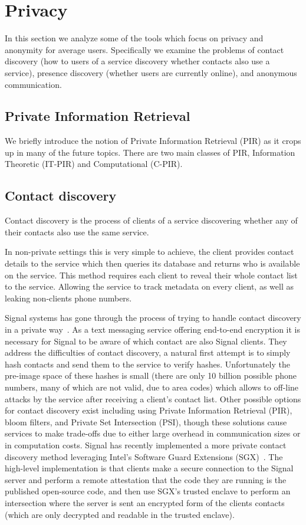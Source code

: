 \section{Privacy}\label{sec:priv}
In this section we analyze some of the tools which focus on privacy and
anonymity for average users. Specifically we examine the problems of contact
discovery (how to users of a service discovery whether contacts also use a
service), presence discovery (whether users are currently online), and anonymous
communication.

\subsection{Private Information Retrieval}
We briefly introduce the notion of Private Information Retrieval (PIR) as it
crops up in many of the future topics. There are two main classes of PIR, Information Theoretic (IT-PIR) and Computational (C-PIR).

\subsection{Contact discovery}
Contact discovery is the process of clients of a service discovering whether any
of their contacts also use the same service.

In non-private settings this is very simple to achieve, the client provides
contact details to the service which then queries its database and returns who
is available on the service. This method requires each client to reveal their
whole contact list to the service. Allowing the service to track metadata on
every client, as well as leaking non-clients phone numbers.

Signal systems has gone through the process of trying to handle contact
discovery in a private way~\cite{marlinspike_2014}. As a text messaging service
offering end-to-end encryption it is necessary for Signal to be aware of which
contact are also Signal clients. They address the difficulties of contact
discovery, a natural first attempt is to simply hash contacts and send them to
the service to verify hashes. Unfortunately the pre-image space of these hashes
is small (there are only 10 billion possible phone numbers, many of which are
not valid, due to area codes) which allows to off-line attacks by the service
after receiving a client's contact list. Other possible options for contact
discovery exist including using Private Information Retrieval (PIR), bloom
filters, and Private Set Intersection (PSI), though these solutions cause
services to make trade-offs due to either large overhead in communication sizes
or in computation costs. Signal has recently implemented a more private contact
discovery method leveraging Intel's Software Guard Extensions
(SGX)~\cite{marlinspike_2017}. The high-level implementation is that clients
make a secure connection to the Signal server and perform a remote attestation
that the code they are running is the published open-source code, and then use
SGX's trusted enclave to perform an intersection where the server is sent an
encrypted form of the clients contacts (which are only decrypted and readable in
the trusted enclave). 

